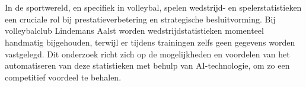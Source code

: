 
%
%
%
%
%

%



\chapter*{}
In de sportwereld, en specifiek in volleybal, spelen wedstrijd- en spelerstatistieken een cruciale rol bij prestatieverbetering en strategische besluitvorming. Bij volleybalclub Lindemans Aalst worden wedstrijdstatistieken momenteel handmatig bijgehouden, terwijl er tijdens trainingen zelfs geen gegevens worden vastgelegd. Dit onderzoek richt zich op de mogelijkheden en voordelen van het automatiseren van deze statistieken met behulp van AI-technologie, om zo een competitief voordeel te behalen.

